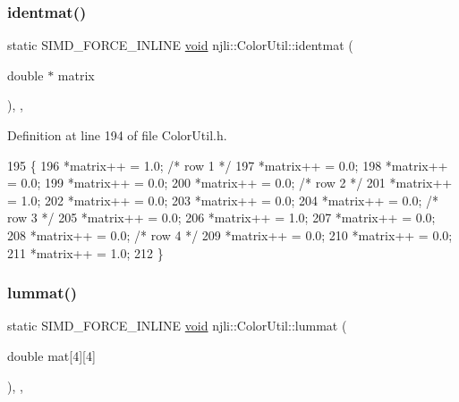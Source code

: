\subsubsection{\texorpdfstring{identmat()}{identmat()}}
{\footnotesize\ttfamily static S\+I\+M\+D\+\_\+\+F\+O\+R\+C\+E\+\_\+\+I\+N\+L\+I\+NE \mbox{\hyperlink{_thread_8h_af1e856da2e658414cb2456cb6f7ebc66}{void}} njli\+::\+Color\+Util\+::identmat (\begin{DoxyParamCaption}\item[{double $\ast$}]{matrix }\end{DoxyParamCaption})\hspace{0.3cm}{\ttfamily [inline]}, {\ttfamily [static]}, {\ttfamily [protected]}}



Definition at line 194 of file Color\+Util.\+h.


\begin{DoxyCode}
195     \{
196       *matrix++ = 1.0; \textcolor{comment}{/* row 1        */}
197       *matrix++ = 0.0;
198       *matrix++ = 0.0;
199       *matrix++ = 0.0;
200       *matrix++ = 0.0; \textcolor{comment}{/* row 2        */}
201       *matrix++ = 1.0;
202       *matrix++ = 0.0;
203       *matrix++ = 0.0;
204       *matrix++ = 0.0; \textcolor{comment}{/* row 3        */}
205       *matrix++ = 0.0;
206       *matrix++ = 1.0;
207       *matrix++ = 0.0;
208       *matrix++ = 0.0; \textcolor{comment}{/* row 4        */}
209       *matrix++ = 0.0;
210       *matrix++ = 0.0;
211       *matrix++ = 1.0;
212     \}
\end{DoxyCode}
\mbox{\label{classnjli_1_1_color_util_aeebe354f55f34c2671f42a6d0f4d1620}} 
\subsubsection{\texorpdfstring{lummat()}{lummat()}}
{\footnotesize\ttfamily static S\+I\+M\+D\+\_\+\+F\+O\+R\+C\+E\+\_\+\+I\+N\+L\+I\+NE \mbox{\hyperlink{_thread_8h_af1e856da2e658414cb2456cb6f7ebc66}{void}} njli\+::\+Color\+Util\+::lummat (\begin{DoxyParamCaption}\item[{double}]{mat\mbox{[}4\mbox{]}\mbox{[}4\mbox{]} }\end{DoxyParamCaption})\hspace{0.3cm}{\ttfamily [inline]}, {\ttfamily [static]}, {\ttfamily [protected]}}



